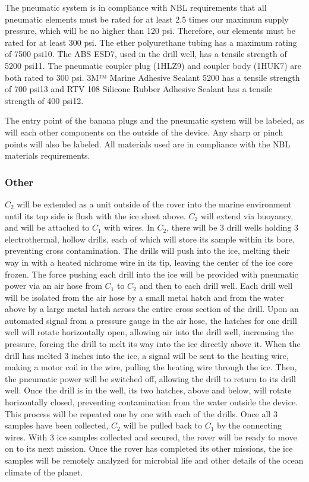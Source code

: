 \documentclass{article}
\begin{document}
The pneumatic system is in compliance with NBL requirements that all pneumatic elements must be rated for at least 2.5 times our maximum supply pressure, which will be no higher than 120 psi. Therefore, our elements must be rated for at least 300 psi. The ether polyurethane tubing has a maximum rating of 7500 psi10. The ABS ESD7, used in the drill well, has a tensile strength of 5200 psi11. The pneumatic coupler plug (1HLZ9) and coupler body (1HUK7) are both rated to 300 psi. 3M™ Marine Adhesive Sealant 5200 has a tensile strength of 700 psi13 and RTV 108 Silicone Rubber Adhesive Sealant has a tensile strength of 400 psi12.\par
The entry point of the banana plugs and the pneumatic system will be labeled, as will each other components on the outside of the device. Any sharp or pinch points will also be labeled. All materials used are in compliance with the NBL materials requirements.

\subsubsection{Other}

$C_2$ will be extended as a unit outside of the rover into the marine environment until its top side is flush with the ice sheet above. $C_2$ will extend via buoyancy, and will be attached to $C_1$ with wires. In $C_2$, there will be 3 drill wells holding 3 electrothermal, hollow drills, each of which will store its sample within its bore, preventing cross contamination. The drills will push into the ice, melting their way in with a heated nichrome wire in its tip, leaving the center of the ice core frozen. The force pushing each drill into the ice will be provided with pneumatic power via an air hose from $C_1$ to $C_2$ and then to each drill well. Each drill well will be isolated from the air hose by a small metal hatch and from the water above by a large metal hatch across the entire cross section of the drill. Upon an automated signal from a pressure gauge in the air hose, the hatches for one drill well will rotate horizontally open, allowing air into the drill well, increasing the pressure, forcing the drill to melt its way into the ice directly above it. When the drill has melted 3 inches into the ice, a signal will be sent to the heating wire, making a motor coil in the wire, pulling the heating wire through the ice. Then, the pneumatic power will be switched off, allowing the drill to return to its drill well. Once the drill is in the well, its two hatches, above and below, will rotate horizontally closed, preventing contamination from the water outside the device. This process will be repeated one by one with each of the drills. Once all 3 samples have been collected, $C_2$ will be pulled back to $C_1$ by the connecting wires. With 3 ice samples collected and secured, the rover will be ready to move on to its next mission. Once the rover has completed its other missions, the ice samples will be remotely analyzed for microbial life and other details of the ocean climate of the planet.
\end{document}
